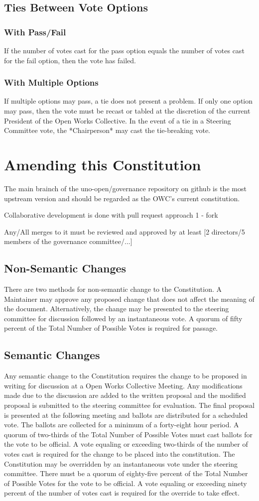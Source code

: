 \documentclass{article}
\newcommand{\article}[1]{\section{#1} \label{#1}}
\newcommand{\asection}[1]{\subsection{#1} \label{#1}}
\newcommand{\asubsection}[1]{\subsubsection{#1} \label{#1}}
\begin{document}
\asection{Ties Between Vote Options}
\asubsection{With Pass/Fail}
If the number of votes cast for the pass option equals the number of votes cast for the fail option, then the vote has failed.
\asubsection{With Multiple Options}
If multiple options may pass, a tie does not present a problem.
If only one option may pass, then the vote must be recast or tabled at the discretion of the current President of the Open Works Collective.
In the event of a tie in a Steering Committee vote, the *Chairperson* may cast the tie-breaking vote.

\article{Amending this Constitution}
The main brainch of the uno-open/governance repository on github is the most upstream version and should be regarded as the OWC's current constitution. 

Collaborative development is done with pull request approach
1 - fork

Any/All merges to it must be reviewed and approved by at least [2 directors/5 members of the governance committee/...]





\asection{Non-Semantic Changes}
There are two methods for non-semantic change to the Constitution.
A Maintainer may approve any proposed change that does not affect the meaning of the document.
Alternatively, the change may be presented to the steering committee for discussion followed by an instantaneous vote.
A quorum of fifty percent of the Total Number of Possible Votes is required for passage.

\asection{Semantic Changes}
Any semantic change to the Constitution requires the change to be proposed in writing for discussion at a Open Works Collective Meeting.
Any modifications made due to the discussion are added to the written proposal and the modified proposal is submitted to the steering committee for evaluation.
The final proposal is presented at the following meeting and ballots are distributed for a scheduled vote.
The ballots are collected for a minimum of a forty-eight hour period.
A quorum of two-thirds of the Total Number of Possible Votes must cast ballots for the vote to be official.
A vote equaling or exceeding two-thirds of the number of votes cast is required for the change to be placed into the constitution.
The Constitution may be overridden by an instantaneous vote under the steering committee.
There must be a quorum of eighty-five percent of the Total Number of Possible Votes for the vote to be official.
A vote equaling or exceeding ninety percent of the number of votes cast is required for the override to take effect.
\end{document}
